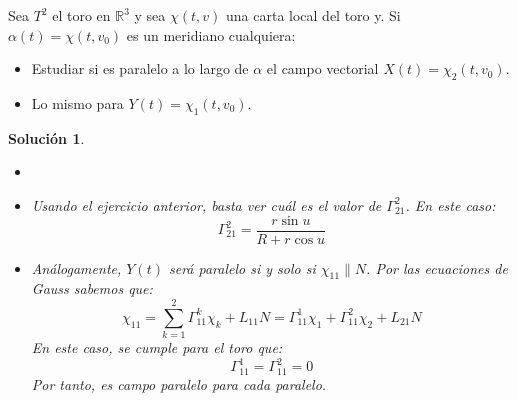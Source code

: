 \documentclass{article}
\theoremstyle{plain}
\newtheorem*{sol*}{Solución}
\newcommand{\R}{\mathbb{R}}
\newcommand{\X}{\chi}
\newenvironment{ejercicio}[2][Estado]{\begin{trivlist}
\item[\hskip \labelsep {\bfseries Ejercicio}\hskip \labelsep {\bfseries #2.}]}{\end{trivlist}}
\begin{document}
\newpage
\begin{ejercicio}{11}
Sea $T^2$ el toro en $\R^3$ y sea $\X(t,v)$ una carta local del toro y. Si $\alpha(t)=\X(t,v_0)$ es un meridiano cualquiera:
\begin{itemize}
\item Estudiar si es paralelo a lo largo de $\alpha$ el campo vectorial $X(t)=\X_2(t,v_0)$.
\item Lo mismo para $Y(t)=\X_1(t,v_0)$.
\end{itemize}
\end{ejercicio}
\begin{sol*}
\begin{itemize}
\item[]
\item Usando el ejercicio anterior, basta ver cuál es el valor de $\Gamma_{21}^2$. En este caso:
\[
\Gamma_{21}^2 = \frac{r\sin u}{R+r\cos u}
\]
\item Análogamente, $Y(t)$ será paralelo si y solo si $\X_{11} \parallel N$. Por las ecuaciones de Gauss sabemos que:
\[
\X_{11} = \sum_{k=1}^2 \Gamma_{11}^k \X_k+ L_{11}N = \Gamma_{11}^1\X_1 + \Gamma_{11}^2\X_2 + L_{21}N
\]
En este caso, se cumple para el toro que:
\[\Gamma_{11}^1=\Gamma_{11}^2=0
\]
Por tanto, es campo paralelo para cada paralelo.
\end{itemize}
\end{sol*}
\end{document}
